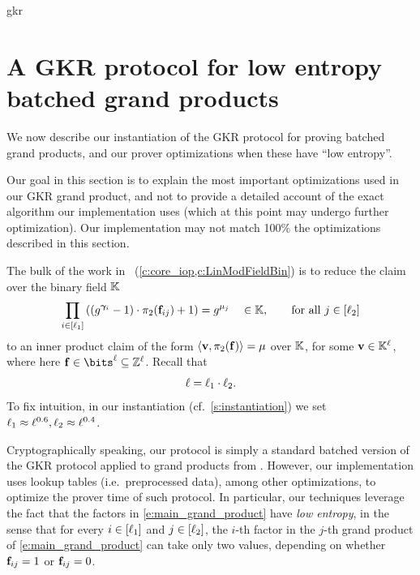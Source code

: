 \begin{lncsappendix}{gkr}
\section{A GKR protocol for low entropy batched grand products }\label{s:gkr_low_entropy}


We now describe our instantiation of the GKR protocol for proving batched grand products, and our prover optimizations when these have ``low entropy''.

\begin{remark}
    Our goal in this section is to explain the most important optimizations used in our GKR grand product, and not to provide a detailed account of the exact algorithm our implementation uses (which at this point may undergo further optimization). Our implementation may not match 100\% the optimizations described in this section.
\end{remark}



The bulk of the work in \ftwoz \ (\cref{c:core_iop,c:LinModFieldBin}) is to reduce the claim over the binary field $\comfield$
\begin{equation}\label{e:main_grand_product}
\prod_{i \in [\codedim_1]} \left(\left(g^{\bm{\gamma}_i}-1\right)\cdot \pi_2(\bff_{ij}) +1\right)= g^{\mu_j}  \quad  \in \comfield, \qquad \text{for all } j\in [\codedim_2]
\end{equation}
to an inner product claim  of the form $\langle \mathbf{v}, \pi_2(\mathbf{f})\rangle =\mu$ over $\comfield$, for some $\vv\in \comfield^{\codedim}$, where here $\bff\in \bits^\codedim \subseteq \ZZ^\codedim$.  Recall that $$\ell=\ell_1\cdot \ell_2.$$ To fix intuition,  in our instantiation (cf.\ \cref{s:instantiation}) we set $\ell_1 \approx \ell^{0.6}, \ell_2\approx\ell^{0.4}$. %


\renewcommand{\comfield}{\KK}


Cryptographically speaking, our protocol is simply a standard batched version of the GKR protocol applied to grand products from \cite{thaler13}. However, our implementation uses lookup tables (i.e.\ preprocessed data), among other optimizations, to optimize the prover time of such protocol. In particular, our techniques leverage the fact that the factors in \eqref{e:main_grand_product} have \emph{low entropy}, in the sense that for every $i\in [\ell_1]$ and $j\in [\ell_2]$, the $i$-th factor in the $j$-th grand product of \eqref{e:main_grand_product} can take only two values, depending on whether $\mathbf{f}_{ij}=1$ or $\mathbf{f}_{ij}=0$.  




\end{lncsappendix}
